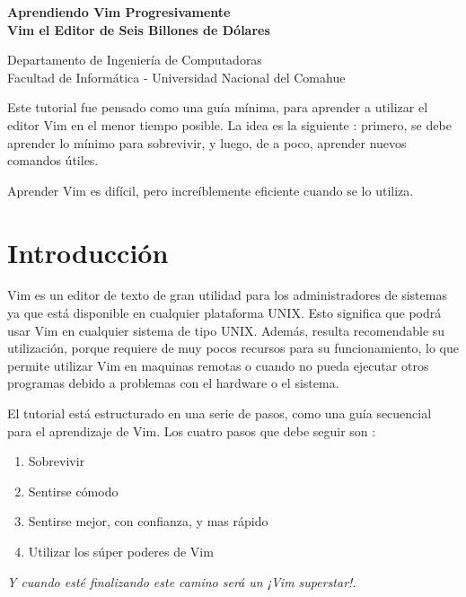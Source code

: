 \documentclass[12pt]{article}
\def\maketitle{

 \makeatletter
 {\color{bl} \centering \huge \sc \textbf{
 Aprendiendo Vim Progresivamente \\ 
\large \vspace*{-8pt} \color{black} Vim el Editor de Seis Billones de Dólares
 \vspace*{8pt} }\par}
 \makeatother


 \makeatletter
 {\centering \small 
 	Departamento de Ingeniería de Computadoras \\
 	Facultad de Informática - Universidad Nacional del Comahue \\
 	\vspace{20pt} }
 \makeatother

}
\begin{document}
\thispagestyle{empty}
\maketitle
\setlength{\parindent}{0pt}


Este tutorial fue pensado como una guía mínima, para aprender a utilizar el editor Vim 
en el menor tiempo posible. La idea es la siguiente : primero, se debe aprender lo mínimo para sobrevivir,
y luego, de a poco, aprender nuevos comandos útiles.

Aprender Vim es difícil, pero increíblemente eficiente cuando se lo utiliza.

\section{Introducción}

Vim es un editor de texto de gran utilidad para los administradores de sistemas ya
que está disponible en cualquier plataforma UNIX. Esto significa
que podrá usar Vim en cualquier sistema de tipo UNIX. Además,
resulta recomendable su utilización, porque requiere de muy pocos
recursos para su funcionamiento, lo que permite utilizar Vim
en maquinas remotas o cuando no pueda ejecutar otros programas
debido a problemas con el hardware o el sistema.


El tutorial está estructurado en una serie de pasos, como una guía
secuencial para el aprendizaje de Vim. Los cuatro pasos que debe seguir son :

\begin{enumerate}
	\item Sobrevivir
	\item Sentirse cómodo
	\item Sentirse mejor, con confianza, y mas rápido
	\item Utilizar los súper poderes de Vim
\end{enumerate}

\textit{Y cuando esté finalizando este camino será un ¡Vim superstar!.}
\end{document}
